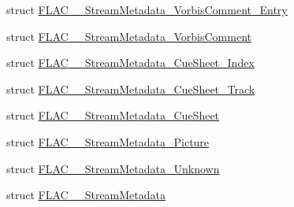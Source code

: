 \begin{DoxyCompactItemize}
\item 
struct \hyperlink{struct_f_l_a_c_____stream_metadata___vorbis_comment___entry}{F\+L\+A\+C\+\_\+\+\_\+\+Stream\+Metadata\+\_\+\+Vorbis\+Comment\+\_\+\+Entry}
\item 
struct \hyperlink{struct_f_l_a_c_____stream_metadata___vorbis_comment}{F\+L\+A\+C\+\_\+\+\_\+\+Stream\+Metadata\+\_\+\+Vorbis\+Comment}
\item 
struct \hyperlink{struct_f_l_a_c_____stream_metadata___cue_sheet___index}{F\+L\+A\+C\+\_\+\+\_\+\+Stream\+Metadata\+\_\+\+Cue\+Sheet\+\_\+\+Index}
\item 
struct \hyperlink{struct_f_l_a_c_____stream_metadata___cue_sheet___track}{F\+L\+A\+C\+\_\+\+\_\+\+Stream\+Metadata\+\_\+\+Cue\+Sheet\+\_\+\+Track}
\item 
struct \hyperlink{struct_f_l_a_c_____stream_metadata___cue_sheet}{F\+L\+A\+C\+\_\+\+\_\+\+Stream\+Metadata\+\_\+\+Cue\+Sheet}
\item 
struct \hyperlink{struct_f_l_a_c_____stream_metadata___picture}{F\+L\+A\+C\+\_\+\+\_\+\+Stream\+Metadata\+\_\+\+Picture}
\item 
struct \hyperlink{struct_f_l_a_c_____stream_metadata___unknown}{F\+L\+A\+C\+\_\+\+\_\+\+Stream\+Metadata\+\_\+\+Unknown}
\item 
struct \hyperlink{struct_f_l_a_c_____stream_metadata}{F\+L\+A\+C\+\_\+\+\_\+\+Stream\+Metadata}
\end{DoxyCompactItemize}
